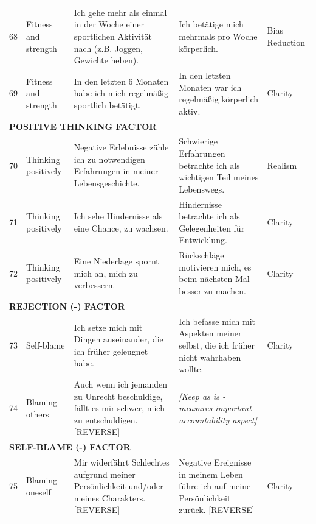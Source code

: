 \documentclass[12pt,a4paper]{article}
\begin{document}
\begin{longtable}{p{}p{}p{}p{}p{}}
68 & Fitness and strength & Ich gehe mehr als einmal in der Woche einer sportlichen Aktivität nach (z.B. Joggen, Gewichte heben). & Ich betätige mich mehrmals pro Woche körperlich. & Bias Reduction \\

69 & Fitness and strength & In den letzten 6 Monaten habe ich mich regelmäßig sportlich betätigt. & In den letzten Monaten war ich regelmäßig körperlich aktiv. & Clarity \\

\midrule
\multicolumn{5}{l}{\textbf{POSITIVE THINKING FACTOR}} \\
\midrule

70 & Thinking positively & Negative Erlebnisse zähle ich zu notwendigen Erfahrungen in meiner Lebensgeschichte. & Schwierige Erfahrungen betrachte ich als wichtigen Teil meines Lebenswegs. & Realism \\

71 & Thinking positively & Ich sehe Hindernisse als eine Chance, zu wachsen. & Hindernisse betrachte ich als Gelegenheiten für Entwicklung. & Clarity \\

72 & Thinking positively & Eine Niederlage spornt mich an, mich zu verbessern. & Rückschläge motivieren mich, es beim nächsten Mal besser zu machen. & Clarity \\

\midrule
\multicolumn{5}{l}{\textbf{REJECTION (-) FACTOR}} \\
\midrule

73 & Self-blame & Ich setze mich mit Dingen auseinander, die ich früher geleugnet habe. & Ich befasse mich mit Aspekten meiner selbst, die ich früher nicht wahrhaben wollte. & Clarity \\

74 & Blaming others & Auch wenn ich jemanden zu Unrecht beschuldige, fällt es mir schwer, mich zu entschuldigen. [REVERSE] & \textit{[Keep as is - measures important accountability aspect]} & -- \\

\midrule
\multicolumn{5}{l}{\textbf{SELF-BLAME (-) FACTOR}} \\
\midrule

75 & Blaming oneself & Mir widerfährt Schlechtes aufgrund meiner Persönlichkeit und/oder meines Charakters. [REVERSE] & Negative Ereignisse in meinem Leben führe ich auf meine Persönlichkeit zurück. [REVERSE] & Clarity \\


\end{longtable}
\end{document}
